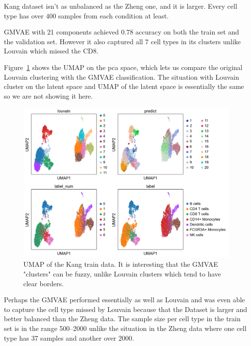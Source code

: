 \documentclass[11pt, a4paper]{report}
\theoremstyle{plain}
\theoremstyle{definition}
\theoremstyle{remark}
\begin{document}

Kang dataset isn't as unbalanced as the Zheng one, and it is larger.
Every cell type has over $400$ samples from each condition at least.

GMVAE with 21 components achieved $0.78$ accuracy on both the train set and the
validation set. However it also captured all $7$ cell types in its clusters 
unlike Louvain which missed the CD8.

Figure~\ref{fig:kang_control_train_gmvae_us_umap} shows the UMAP on the pca
space, which lets us compare the original Louvain clustering with the GMVAE
classification. The situation with Louvain cluster on the latent space and UMAP
of the latent space is essentially the same so we are not showing it here. 

\begin{figure}[h]
\centering
\includegraphics[width=1.1\textwidth]{images/gmmvae_Kang_control_train_us_21c_umap.png}
\caption{
UMAP of the Kang train data. It is interesting that the GMVAE "clusters" can be fuzzy,
unlike Louvain clusters which tend to have clear borders.
}
\label{fig:kang_control_train_gmvae_us_umap}
\end{figure}

Perhaps the GMVAE performed essentially as well as Louvain and was even able to
capture the cell type missed by Louvain because that the Dataset is larger and
better balanced than the Zheng data.
The sample size per cell type in the train set is in the range 500--2000 unlike
the situation in the Zheng data where one cell type has 37 samples and another
over 2000.
\end{document}

